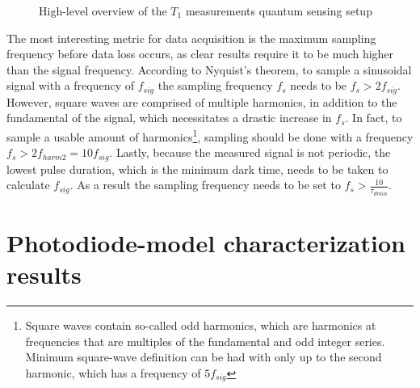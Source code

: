 \begin{figure}[ht]
	\centering
	\caption{High-level overview of the $T_1$ measurements quantum sensing setup}
	\label{fig:test:daq}
\end{figure}

The most interesting metric for data acquisition is the maximum sampling frequency before data loss occurs, as clear results require it to be much higher than the signal frequency. According to Nyquist's theorem, to sample a sinusoidal signal with a frequency of $f_{sig}$ the sampling frequency $f_s$ needs to be $f_s > 2f_{sig}$. However, square waves are comprised of multiple harmonics, in addition to the fundamental of the signal, which necessitates a drastic increase in $f_s$. In fact, to sample a usable amount of harmonics\footnote{Square waves contain so-called odd harmonics, which are harmonics at frequencies that are multiples of the fundamental and odd integer series. Minimum square-wave definition can be had with only up to the second harmonic, which has a frequency of $5f_{sig}$}, sampling should be done with a frequency $f_s > 2f_{harm2} = 10f_{sig}$. Lastly, because the measured signal is not periodic, the lowest pulse duration, which is the minimum dark time, needs to be taken to calculate $f_{sig}$. As a result the sampling frequency needs to be set to $f_s > \frac{10}{\tau_{dmin}}$.



\section{Photodiode-model characterization results}
